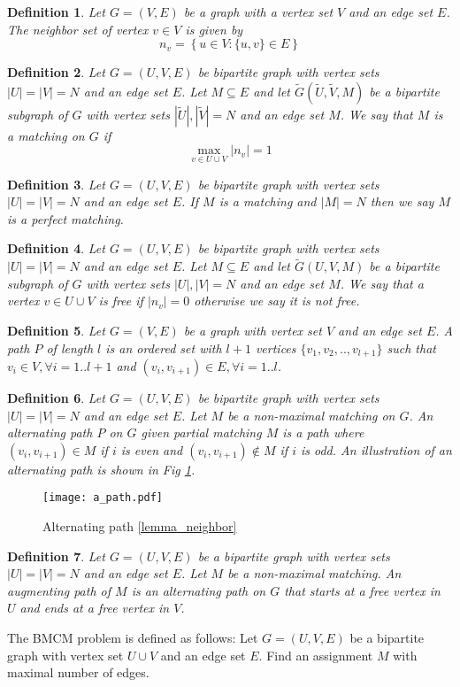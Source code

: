 \documentclass[11pt,onecolumn]{article}
\newcounter{theorem}
\newcounter{definition}
\newtheorem{definition}{Definition}
\newcommand{\beq}{\begin{equation}}
\newcommand{\eeq}{\end{equation}}
\begin{document}
\begin{definition}
Let $G=(V,E)$ be a graph with a vertex set $V$ and an edge set $E$. The neighbor set of vertex $v\in V$ is given by
\beq
n_v=\left\{u \in V: \{u,v\}\in E\right\}
\eeq
\end{definition}
\begin{definition}
Let $G=(U,V,E)$ be bipartite graph with vertex sets $|U|=|V|=N$ and an edge set $E$. Let $M\subseteq E$ and let $\tilde{G}(\tilde{U},\tilde{V},M)$ be a bipartite subgraph of $G$ with vertex sets $|\tilde{U}|,|\tilde{V}|=N$ and an edge set $M$. We say that $M$ is a matching on $G$ if
\beq
\max_{v\in U\cup V}|n_v|=1
\eeq
\end{definition}
\begin{definition} Let $G=(U,V,E)$ be bipartite graph with vertex sets $|U|=|V|=N$ and an edge set $E$. If $M$ is a matching and $|M|=N$ then we say $M$ is a perfect matching.
\end{definition}
\begin{definition}
Let $G=(U,V,E)$ be bipartite graph with vertex sets $|U|=|V|=N$ and an edge set $E$. Let $M\subseteq E$ and let $\tilde{G}(U,V,M)$ be a bipartite subgraph of $G$ with vertex sets $|U|,|V|=N$ and an edge set $M$.
We say that a vertex $v\in U \cup V $ is free if $|n_v|=0$ otherwise we say it is not free.
\end{definition}
\begin{definition}
 Let $G=(V,E)$ be a graph with vertex set $V$ and an edge set $E$. A \emph{path} $P$ of length $l$ is an ordered set with $l+1$ vertices $\{v_1,v_2,..,v_{l+1}\}$ such that $v_i\in V,\forall i=1..l+1$ and $(v_i,v_{i+1})\in E ,\forall i=1..l$.
\end{definition}
\begin{definition}
Let $G=(U,V,E)$ be bipartite graph with vertex sets $|U|=|V|=N$ and an edge set $E$. Let $M$ be a non-maximal matching on $G$.  An \emph{alternating path} $P$ on $G$ given partial matching $M$ is a path where $(v_i,v_{i+1})\in M$ if $i$ is even and $(v_i,v_{i+1})\notin M$ if $i$ is odd. An illustration of an alternating path is shown in Fig \ref{figure_alternating_path}.
\end{definition}
\begin{figure}[htbp]
\centering \texttt{[image: a\_path.pdf]}
\caption{Alternating path \ref{lemma_neighbor} }
\label{figure_alternating_path}
\end{figure}
\begin{definition}
Let $G=(U,V,E)$ be a bipartite graph with vertex sets $|U|=|V|=N$ and an edge set $E$. Let $M$ be a non-maximal matching. An \emph{augmenting path} of $M$ is an alternating path on $G$ that starts at a free vertex in $U$ and ends at a free vertex in $V$.
\end{definition}
The BMCM problem is defined as follows:
 Let $G=(U,V,E)$ be a bipartite graph with vertex set $U\cup V$ and an edge set $E$. Find an assignment $M$ with maximal number of edges.
\end{document}
